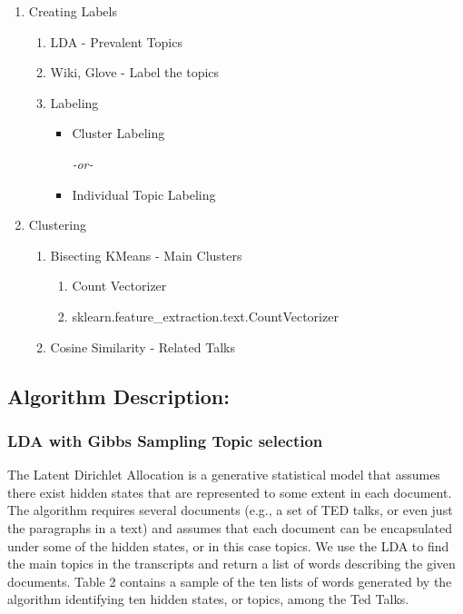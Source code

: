 \documentclass[letterpaper, 11pt]{article}
\providecommand{\tightlist}{%
      \setlength{\itemsep}{0pt}\setlength{\parskip}{0pt}}
\begin{document}
\begin{enumerate}
\def\labelenumi{\arabic{enumi}.}
\tightlist
\item
  Creating Labels

  \begin{enumerate}
  \def\labelenumii{\arabic{enumii}.}
  \setcounter{enumii}{1}
  \tightlist
  \item
    LDA - Prevalent Topics
  \item
    Wiki, Glove - Label the topics
  \item
    Labeling

    \begin{itemize}
    \item
      Cluster Labeling

      \emph{-or-}
    \item
      Individual Topic Labeling
    \end{itemize}
  \end{enumerate}
\item
  Clustering

  \begin{enumerate}
  \def\labelenumii{\arabic{enumii}.}
  \setcounter{enumii}{1}
  \tightlist
  \item
    Bisecting KMeans - Main Clusters

    \begin{enumerate}
    \def\labelenumiii{\arabic{enumiii}.}
    \setcounter{enumiii}{2}
    \tightlist
    \item
      Count Vectorizer
    \item
      sklearn.feature\_extraction.text.CountVectorizer
    \end{enumerate}
  \item
    Cosine Similarity - Related Talks
  \end{enumerate}
\end{enumerate}

\subsection{Algorithm Description:}\label{algorithm-description}

\subsubsection{LDA with Gibbs Sampling Topic
selection}\label{lda-with-gibbs-sampling-topic-selection}

The Latent Dirichlet Allocation is a generative statistical model
that assumes there exist hidden states that are represented to some
extent in each document. The algorithm requires several documents
(e.g., a set of TED talks, or even just the paragraphs in a text) 
and assumes that each document can be encapsulated under some of 
the hidden states, or in this case topics. We use the LDA to find 
the main topics in the transcripts and return a list of words 
describing the given documents. Table 2 contains a sample of the 
ten lists of words generated by the algorithm identifying ten hidden
states, or topics, among the Ted Talks.
\end{document}
